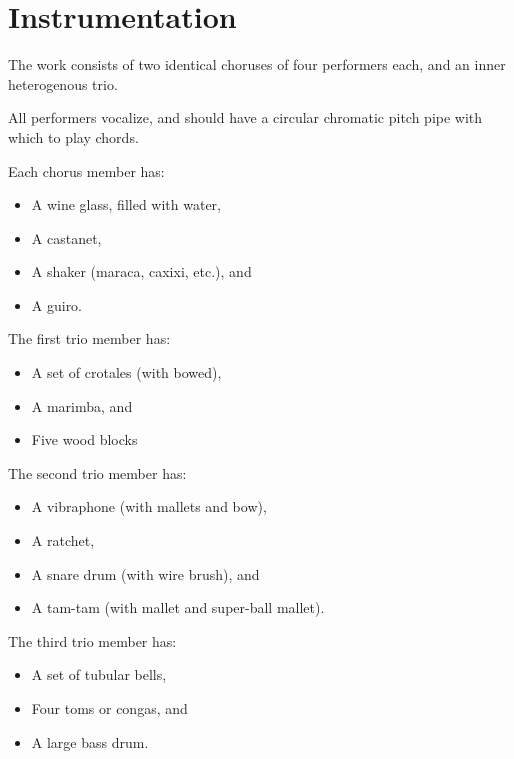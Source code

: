 \section{Instrumentation}

The work consists of two identical choruses of four performers each, and an
inner heterogenous trio.

All performers vocalize, and should have a circular chromatic pitch pipe with
which to play chords.

Each chorus member has:

\begin{itemize}
\item A wine glass, filled with water,
\item A castanet,
\item A shaker (maraca, caxixi, etc.), and
\item A guiro.
\end{itemize}

The first trio member has:

\begin{itemize}
\item A set of crotales (with bowed),
\item A marimba, and
\item Five wood blocks
\end{itemize}

The second trio member has:

\begin{itemize}
\item A vibraphone (with mallets and bow),
\item A ratchet,
\item A snare drum (with wire brush), and
\item A tam-tam (with mallet and super-ball mallet).
\end{itemize}

The third trio member has:

\begin{itemize}
\item A set of tubular bells,
\item Four toms or congas, and
\item A large bass drum.
\end{itemize}
